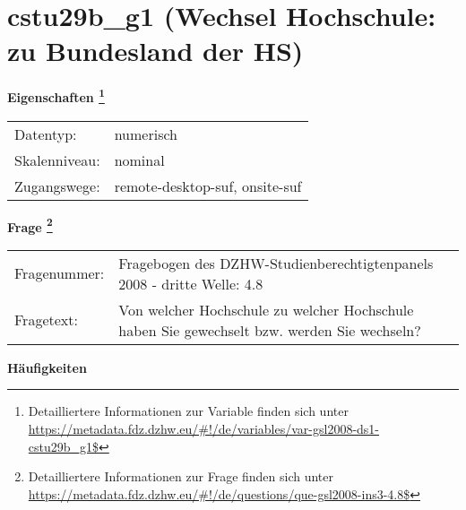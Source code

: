 
    \setcounter{footnote}{0}

    \vspace*{-1.8cm}
	\section{cstu29b\_g1 (Wechsel Hochschule: zu Bundesland der HS)}
	\label{section:cstu29b_g1}



    \vspace*{0.5cm}
    \noindent\textbf{Eigenschaften
	\footnote{Detailliertere Informationen zur Variable finden sich unter
		\url{https://metadata.fdz.dzhw.eu/\#!/de/variables/var-gsl2008-ds1-cstu29b_g1$}}}\\
	\begin{tabularx}{\hsize}{@{}lX}
	Datentyp: & numerisch \\
	Skalenniveau: & nominal \\
	Zugangswege: &
	  remote-desktop-suf, 
	  onsite-suf
 \\
    \end{tabularx}



				\vspace*{0.5cm}
                \noindent\textbf{Frage
	                \footnote{Detailliertere Informationen zur Frage finden sich unter
		              \url{https://metadata.fdz.dzhw.eu/\#!/de/questions/que-gsl2008-ins3-4.8$}}}\\
				\begin{tabularx}{\hsize}{@{}lX}
					Fragenummer: &
					  Fragebogen des DZHW-Studienberechtigtenpanels 2008 - dritte Welle:
					  4.8
 \\
					Fragetext: & Von welcher Hochschule zu welcher Hochschule haben Sie gewechselt bzw. werden Sie wechseln? \\
				\end{tabularx}





        		\vspace*{0.5cm}
                \noindent\textbf{Häufigkeiten}

